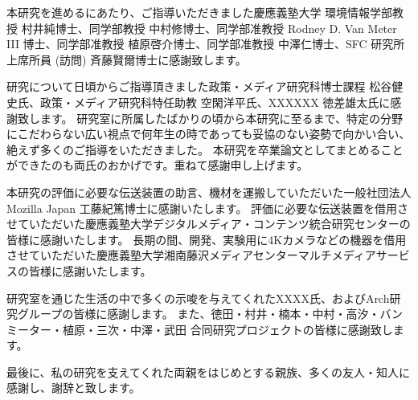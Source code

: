 \begin{acknowledgment}

本研究を進めるにあたり、ご指導いただきました慶應義塾大学 環境情報学部教授 村井純博士、同学部教授 中村修博士、同学部准教授 Rodney D. Van Meter III 博士、同学部准教授 植原啓介博士、同学部准教授 中澤仁博士、SFC 研究所 上席所員 (訪問) 斉藤賢爾博士に感謝致します。

研究について日頃からご指導頂きました政策・メディア研究科博士課程 松谷健史氏、政策・メディア研究科特任助教 空閑洋平氏、XXXXXX 徳差雄太氏に感謝致します。
研究室に所属したばかりの頃から本研究に至るまで、特定の分野にこだわらない広い視点で何年生の時であっても妥協のない姿勢で向かい合い、絶えず多くのご指導をいただきました。
本研究を卒業論文としてまとめることができたのも両氏のおかげです。重ねて感謝申し上げます。

本研究の評価に必要な伝送装置の助言、機材を運搬していただいた一般社団法人 Mozilla Japan 工藤紀篤博士に感謝いたします。
評価に必要な伝送装置を借用させていただいた慶應義塾大学デジタルメディア・コンテンツ統合研究センターの皆様に感謝いたします。
長期の間、開発、実験用に4Kカメラなどの機器を借用させていただいた慶應義塾大学湘南藤沢メディアセンターマルチメディアサービスの皆様に感謝いたします。

研究室を通じた生活の中で多くの示唆を与えてくれたXXXX氏、およびArch研究グループの皆様に感謝します。
また、徳田・村井・楠本・中村・高汐・バンミーター・植原・三次・中澤・武田 合同研究プロジェクトの皆様に感謝致します。

最後に、私の研究を支えてくれた両親をはじめとする親族、多くの友人・知人に感謝し、謝辞と致します。


\end{acknowledgment}
